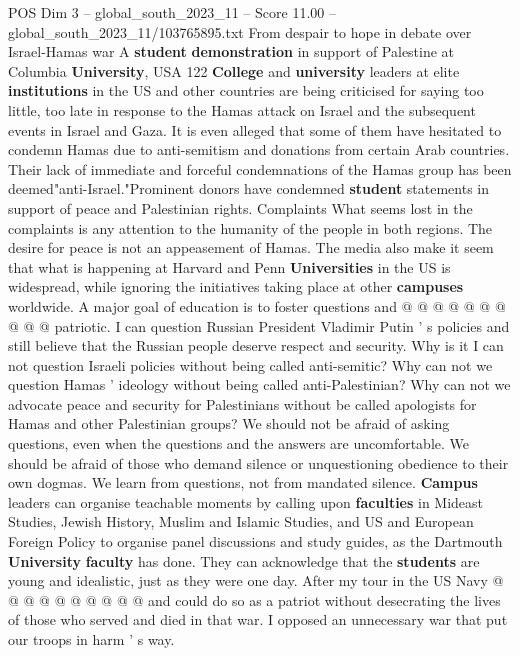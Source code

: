 \begin{textsample}{POS Dim 3 – global\_south\_2023\_11 – Score 11.00 – global\_south\_2023\_11/103765895.txt}  \label{ex:f3_pos_352}
From despair to hope in debate over Israel-Hamas war A \textbf{student} \textbf{demonstration} in support of Palestine at Columbia \textbf{University}, USA 122 \textbf{College} and \textbf{university} leaders at elite \textbf{institutions} in the US and other countries are being criticised for saying too little, too late in response to the Hamas attack on Israel and the subsequent events in Israel and Gaza.
It is even alleged that some of them have hesitated to condemn Hamas due to anti-semitism and donations from certain Arab countries.
Their lack of immediate and forceful condemnations of the Hamas group has been deemed"anti-Israel."Prominent donors have condemned \textbf{student} statements in support of peace and Palestinian rights.
Complaints What seems lost in the complaints is any attention to the humanity of the people in both regions.
The desire for peace is not an appeasement of Hamas.
The media also make it seem that what is happening at Harvard and Penn \textbf{Universities} in the US is widespread, while ignoring the initiatives taking place at other \textbf{campuses} worldwide.
A major goal of education is to foster questions and @ @ @ @ @ @ @ @ @ @ patriotic.
I can question Russian President Vladimir Putin ' s policies and still believe that the Russian people deserve respect and security.
Why is it I can not question Israeli policies without being called anti-semitic?
Why can not we question Hamas ' ideology without being called anti-Palestinian?
Why can not we advocate peace and security for Palestinians without be called apologists for Hamas and other Palestinian groups?
We should not be afraid of asking questions, even when the questions and the answers are uncomfortable.
We should be afraid of those who demand silence or unquestioning obedience to their own dogmas.
We learn from questions, not from mandated silence. \textbf{Campus} leaders can organise teachable moments by calling upon \textbf{faculties} in Mideast Studies, Jewish History, Muslim and Islamic Studies, and US and European Foreign Policy to organise panel discussions and study guides, as the Dartmouth \textbf{University} \textbf{faculty} has done.
They can acknowledge that the \textbf{students} are young and idealistic, just as they were one day.
After my tour in the US Navy @ @ @ @ @ @ @ @ @ @ and could do so as a patriot without desecrating the lives of those who served and died in that war.
I opposed an unnecessary war that put our troops in harm ' s way.

\end{textsample}
